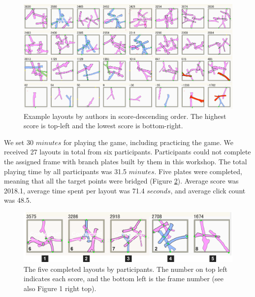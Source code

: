 \begin{figure}[ht]
	\begin{center}
		\includegraphics[width = 0.4\paperwidth]{images/fabrication/designs_score.png}
		\caption{Example layouts by authors in score-descending order. The highest score is top-left and the lowest score is bottom-right.}
		\label{fig:testlayouts}
	\end{center}
\end{figure}



We set 30 $minutes$ for playing the game, including practicing the game.
We received 27 layouts in total from six participants.
Participants could not complete the assigned frame with branch plates built by them in this workshop.
The total playing time by all participants was 31.5 $minutes$.
Five plates were completed, meaning that all the target points were bridged (Figure \ref{fig:layouts}).
Average score was 2018.1, average time spent per layout was 71.4 $seconds$, and average click count was 48.5.

\begin{figure}[ht]
	\begin{center}
		\includegraphics[width = 0.4\paperwidth]{images/fabrication/casestudy.pdf}
		\caption{The five completed layouts by participants. The number on top left indicates each score, and the bottom left is the frame number (see also Figure 1 right top).   }
		\label{fig:layouts}
	\end{center}
\end{figure}

